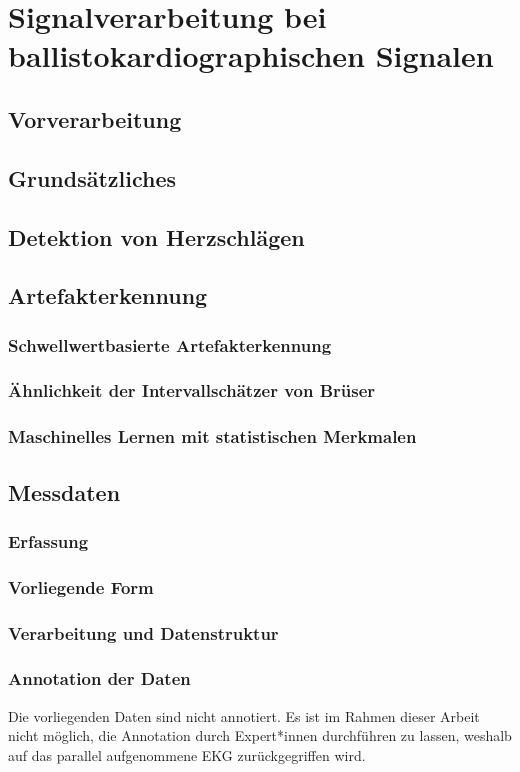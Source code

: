 \chapter{Signalverarbeitung bei ballistokardiographischen Signalen}

\section{Vorverarbeitung}

\section{Grundsätzliches}

\section{Detektion von Herzschlägen}

\section{Artefakterkennung}

	\subsection{Schwellwertbasierte Artefakterkennung}
	
	\subsection{Ähnlichkeit der Intervallschätzer von Brüser}
	
	\subsection{Maschinelles Lernen mit statistischen Merkmalen}

\section{Messdaten}
	
	\subsection{Erfassung}
	
	\subsection{Vorliegende Form}
	
	\subsection{Verarbeitung und Datenstruktur}

	\subsection{Annotation der Daten}

Die vorliegenden Daten sind nicht annotiert. Es ist im Rahmen dieser Arbeit nicht möglich, die Annotation durch Expert*innen durchführen zu lassen, weshalb auf das parallel aufgenommene \ac{EKG} zurückgegriffen wird.
